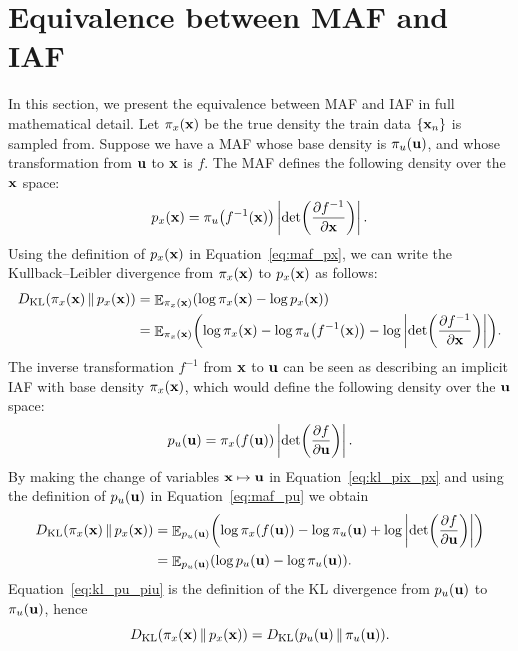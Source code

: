 
\section{Equivalence between MAF and IAF}
\label{sec:equivalence}

In this section, we present the equivalence between MAF and IAF in full mathematical detail. Let $\pi_x\br{\vect{x}}$ be the true density the train data $\set{\vect{x}_n}$ is sampled from. Suppose we have a MAF whose base density is $\pi_u\br{\vect{u}}$, and whose transformation from $\vect{u}$ to $\vect{x}$ is $f$. The MAF defines the following density over the $\vect{x}$ space:
\begin{equation}
\label{eq:maf_px}
p_x\br{\vect{x}} = \pi_u\br{f^{-1}\br{\vect{x}}}\abs{\det\br{\deriv{f^{-1}}{\vect{x}}}}.
\end{equation}
Using the definition of $p_x\br{\vect{x}}$ in Equation~\eqref{eq:maf_px}, we can write the Kullback--Leibler divergence from $\pi_x\br{\vect{x}}$ to $p_x\br{\vect{x}}$ as follows:
\begin{align}
\kl{\pi_x\br{\vect{x}}}{p_x\br{\vect{x}}} &= \avg{\log{\pi_x\br{\vect{x}}}-\log{p_x\br{\vect{x}}}}{\pi_x\br{\vect{x}}} \\
&= \avg{\log{\pi_x\br{\vect{x}}}-\log{\pi_u\br{f^{-1}\br{\vect{x}}}} - \log{\abs{\det\br{\deriv{f^{-1}}{\vect{x}}}}}}{\pi_x\br{\vect{x}}}.
\label{eq:kl_pix_px}
\end{align}
The inverse transformation $f^{-1}$ from $\vect{x}$ to $\vect{u}$ can be seen as describing an implicit IAF with base density $\pi_x\br{\vect{x}}$, which would define the following density over the $\vect{u}$ space:
\begin{equation}
\label{eq:maf_pu}
p_u\br{\vect{u}} = \pi_x\br{f\br{\vect{u}}}\abs{\det\br{\deriv{f}{\vect{u}}}}.
\end{equation}
By making the change of variables $\vect{x} \mapsto \vect{u}$ in Equation~\eqref{eq:kl_pix_px} and using the definition of $p_u\br{\vect{u}}$ in Equation~\eqref{eq:maf_pu} we obtain
\begin{align}
\kl{\pi_x\br{\vect{x}}}{p_x\br{\vect{x}}} &=
\avg{\log{\pi_x\br{f\br{\vect{u}}}}-\log{\pi_u\br{\vect{u}}} + \log{\abs{\det\br{\deriv{f}{\vect{u}}}}}}{p_u\br{\vect{u}}} \\
& = \avg{\log{p_u\br{\vect{u}}}-\log{\pi_u\br{\vect{u}}}}{p_u\br{\vect{u}}}.
\label{eq:kl_pu_piu}
\end{align}
Equation~\eqref{eq:kl_pu_piu} is the definition of the KL divergence from $p_u\br{\vect{u}}$ to $\pi_u\br{\vect{u}}$, hence
\begin{equation}
\kl{\pi_x\br{\vect{x}}}{p_x\br{\vect{x}}} = \kl{p_u\br{\vect{u}}}{\pi_u\br{\vect{u}}}. 
\end{equation}


